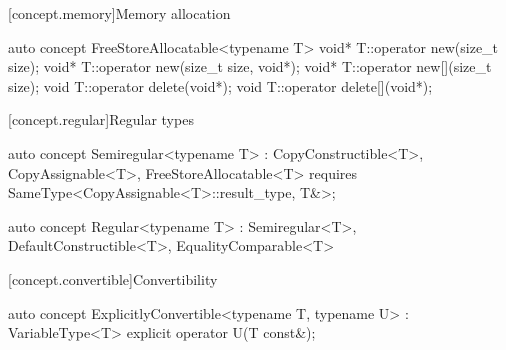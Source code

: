 \documentclass[american,twoside]{book}
\begin{document}
[concept.memory]{Memory allocation}
\begin{itemdecl}
auto concept FreeStoreAllocatable<typename T> {
  void* T::operator new(size_t size);
  void* T::operator new(size_t size, void*);
  void* T::operator new[](size_t size);
  void T::operator delete(void*);
  void T::operator delete[](void*);
}
\end{itemdecl}

\begin{itemdescr}
\pnum
{}
\end{itemdescr}

[concept.regular]{Regular types}

\begin{itemdecl}
auto concept Semiregular<typename T> : CopyConstructible<T>, CopyAssignable<T>, FreeStoreAllocatable<T> { 
  requires SameType<CopyAssignable<T>::result_type, T&>;
}
\end{itemdecl}

\begin{itemdescr}
\pnum 
{}
\end{itemdescr}

\begin{itemdecl}
auto concept Regular<typename T> 
  : Semiregular<T>, DefaultConstructible<T>, EqualityComparable<T> { }
\end{itemdecl}

\begin{itemdescr}
\pnum
{}
\end{itemdescr}

[concept.convertible]{Convertibility}

\begin{itemdecl}
auto concept ExplicitlyConvertible<typename T, typename U> : VariableType<T> {
  explicit operator U(T const&);
}
\end{itemdecl}

\begin{itemdescr}
\pnum
{} 
\end{itemdescr}
\end{document}
